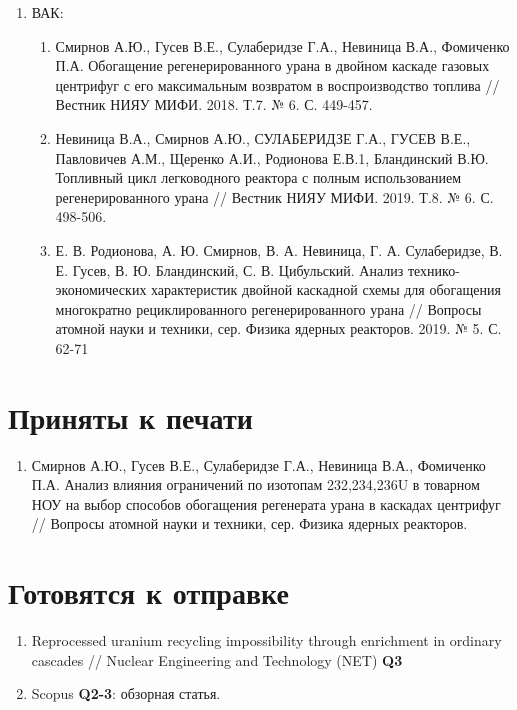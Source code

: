 \begin{enumerate}
\begin{enumerate}
    \end{enumerate}
    \item ВАК:
    \begin{enumerate}
        \item Смирнов А.Ю., Гусев В.Е., Сулаберидзе Г.А., Невиница В.А., Фомиченко П.А. Обогащение регенерированного урана в двойном каскаде газовых центрифуг с его максимальным возвратом в воспроизводство топлива // Вестник НИЯУ МИФИ. 2018. Т.7. № 6. С. 449-457.
        \item 	Невиница В.А., Смирнов А.Ю., СУЛАБЕРИДЗЕ Г.А., ГУСЕВ В.Е., Павловичев А.М., Щеренко А.И., Родионова Е.В.1, Бландинский В.Ю. Топливный цикл легководного реактора с полным использованием регенерированного урана // Вестник НИЯУ МИФИ. 2019. Т.8. № 6. С. 498-506.
        \item Е. В. Родионова, А. Ю. Смирнов, В. А. Невиница, Г. А. Сулаберидзе, В. Е. Гусев, В. Ю. Бландинский, С. В. Цибульский. Анализ технико-экономических характеристик двойной каскадной схемы для обогащения многократно рециклированного регенерированного урана // Вопросы атомной науки и техники, сер. Физика ядерных реакторов. 2019. № 5. С. 62-71
        \end{enumerate}
\end{enumerate}

\section{Приняты к печати}
\begin{enumerate}
    \item Смирнов А.Ю., Гусев В.Е., Сулаберидзе Г.А., Невиница В.А., Фомиченко П.А. Анализ влияния ограничений по изотопам 232,234,236U в товарном НОУ на выбор способов обогащения регенерата урана в каскадах центрифуг //  Вопросы атомной науки и техники, сер. Физика ядерных реакторов.
\end{enumerate}

\section{Готовятся к отправке}
\begin{enumerate}
    \item Reprocessed uranium recycling impossibility through enrichment in ordinary cascades // Nuclear Engineering and Technology (NET) \textbf{Q3}
    \item Scopus \textbf{Q2-3}: обзорная статья.
\end{enumerate}

